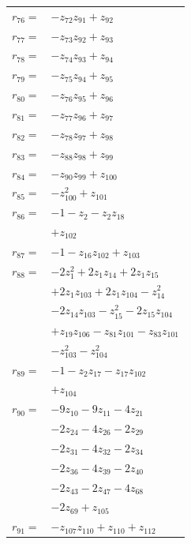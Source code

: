 \begin{longtable}{@{}r@{\;}l@{}}
\(r_{76}=\) & \(\displaystyle -z_{72}z_{91} +z_{92}\) \\[3pt]
\(r_{77}=\) & \(\displaystyle -z_{73}z_{92} +z_{93}\) \\[3pt]
\(r_{78}=\) & \(\displaystyle -z_{74}z_{93} +z_{94}\) \\[3pt]
\(r_{79}=\) & \(\displaystyle -z_{75}z_{94} +z_{95}\) \\[3pt]
\(r_{80}=\) & \(\displaystyle -z_{76}z_{95} +z_{96}\) \\[3pt]
\(r_{81}=\) & \(\displaystyle -z_{77}z_{96} +z_{97}\) \\[3pt]
\(r_{82}=\) & \(\displaystyle -z_{78}z_{97} +z_{98}\) \\[3pt]
\(r_{83}=\) & \(\displaystyle -z_{88}z_{98} +z_{99}\) \\[3pt]
\(r_{84}=\) & \(\displaystyle -z_{90}z_{99} +z_{100}\) \\[3pt]
\(r_{85}=\) & \(\displaystyle -z_{100}^{2} +z_{101}\) \\[3pt]
\(r_{86}=\) & \(\displaystyle -1 -z_{2} -z_{2}z_{18}\) \\
 & \(\displaystyle +z_{102}\) \\[3pt]
\(r_{87}=\) & \(\displaystyle -1 -z_{16}z_{102} +z_{103}\) \\[3pt]
\(r_{88}=\) & \(\displaystyle -2z_{1}^{2} +2z_{1}z_{14} +2z_{1}z_{15}\) \\
 & \(\displaystyle +2z_{1}z_{103} +2z_{1}z_{104} -z_{14}^{2}\) \\
 & \(\displaystyle -2z_{14}z_{103} -z_{15}^{2} -2z_{15}z_{104}\) \\
 & \(\displaystyle +z_{19}z_{106} -z_{81}z_{101} -z_{83}z_{101}\) \\
 & \(\displaystyle -z_{103}^{2} -z_{104}^{2}\) \\[3pt]
\(r_{89}=\) & \(\displaystyle -1 -z_{2}z_{17} -z_{17}z_{102}\) \\
 & \(\displaystyle +z_{104}\) \\[3pt]
\(r_{90}=\) & \(\displaystyle -9z_{10} -9z_{11} -4z_{21}\) \\
 & \(\displaystyle -2z_{24} -4z_{26} -2z_{29}\) \\
 & \(\displaystyle -2z_{31} -4z_{32} -2z_{34}\) \\
 & \(\displaystyle -2z_{36} -4z_{39} -2z_{40}\) \\
 & \(\displaystyle -2z_{43} -2z_{47} -4z_{68}\) \\
 & \(\displaystyle -2z_{69} +z_{105}\) \\[3pt]
\(r_{91}=\) & \(\displaystyle -z_{107}z_{110} +z_{110} +z_{112}\) \\[3pt]

\end{longtable}
